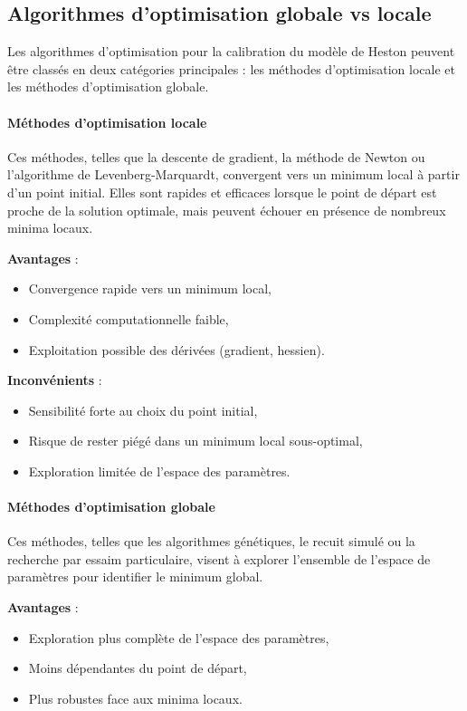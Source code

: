 \subsection{Algorithmes d'optimisation globale vs locale}

Les algorithmes d'optimisation pour la calibration du modèle de Heston peuvent être classés en deux catégories principales : les méthodes d'optimisation locale et les méthodes d'optimisation globale.

\paragraph{Méthodes d'optimisation locale} Ces méthodes, telles que la descente de gradient, la méthode de Newton ou l'algorithme de Levenberg-Marquardt, convergent vers un minimum local à partir d'un point initial. Elles sont rapides et efficaces lorsque le point de départ est proche de la solution optimale, mais peuvent échouer en présence de nombreux minima locaux.

\textbf{Avantages} :
\begin{itemize}
	\item Convergence rapide vers un minimum local,
	\item Complexité computationnelle faible,
	\item Exploitation possible des dérivées (gradient, hessien).
\end{itemize}

\textbf{Inconvénients} :
\begin{itemize}
	\item Sensibilité forte au choix du point initial,
	\item Risque de rester piégé dans un minimum local sous-optimal,
	\item Exploration limitée de l'espace des paramètres.
\end{itemize}

\paragraph{Méthodes d'optimisation globale} Ces méthodes, telles que les algorithmes génétiques, le recuit simulé ou la recherche par essaim particulaire, visent à explorer l'ensemble de l'espace de paramètres pour identifier le minimum global.

\textbf{Avantages} :
\begin{itemize}
	\item Exploration plus complète de l'espace des paramètres,
	\item Moins dépendantes du point de départ,
	\item Plus robustes face aux minima locaux.
\end{itemize}

